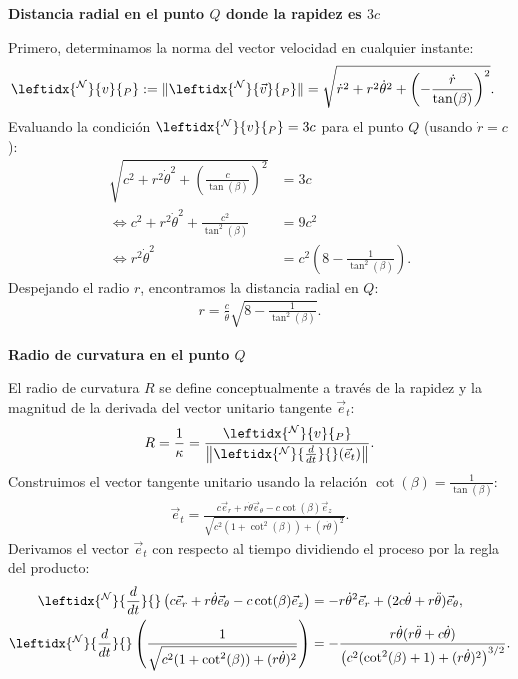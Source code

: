 \begin{tcolorbox}[title=Arbol de Navidad(pero sin condicion de R y $\theta$),breakable]
\vspace{0.8em}
\noindent\textbf{Distancia radial en el punto $Q$ donde la rapidez es $3c$}

Primero, determinamos la norma del vector velocidad en cualquier instante:
\begin{align*}
    \leftidx{^{\mathcal{N}}}{v}{_P} := \| \leftidx{^{\mathcal{N}}}{\vec{v}}{_P} \| &= \sqrt{ \dot{r}^2 + r^2\dot{\theta}^2 + \left( -\frac{\dot{r}}{\tan(\beta)} \right)^2 }.
\end{align*}
Evaluando la condición $\leftidx{^{\mathcal{N}}}{v}{_P} = 3c$ para el punto $Q$ (usando $\dot{r} = c$):
\begin{align*}
    \sqrt{ c^2 + r^2\dot{\theta}^2 + \left( \frac{c}{\tan(\beta)} \right)^2 } &= 3c \\
    \Leftrightarrow c^2 + r^2\dot{\theta}^2 + \frac{c^2}{\tan^2(\beta)} &= 9c^2 \\
    \Leftrightarrow r^2\dot{\theta}^2 &= c^2 \left( 8 - \frac{1}{\tan^2(\beta)} \right).
\end{align*}
Despejando el radio $r$, encontramos la distancia radial en $Q$:
\begin{align*}
    r = \frac{c}{\dot{\theta}} \sqrt{8 - \frac{1}{\tan^2(\beta)}}.
\end{align*}

\vspace{0.8em}
\noindent\textbf{Radio de curvatura en el punto $Q$}



El radio de curvatura $R$ se define conceptualmente a través de la rapidez y la magnitud de la derivada del vector unitario tangente $\vec{e}_t$:
\[
    R = \frac{1}{\kappa} = \frac{\leftidx{^{\mathcal{N}}}{v}{_P}}{\left\| \leftidx{^{\mathcal{N}}}{\frac{d}{dt}}{} (\vec{e}_t) \right\|}.
\]
Construimos el vector tangente unitario usando la relación $\cot(\beta) = \frac{1}{\tan(\beta)}$:
\begin{align*}
    \vec{e}_t = \frac{c\vec{e}_r + r\dot{\theta}\vec{e}_{\theta} - c\cot(\beta)\vec{e}_z}{\sqrt{c^2(1+\cot^2(\beta)) + (r\dot{\theta})^2}}.
\end{align*}
Derivamos el vector $\vec{e}_t$ con respecto al tiempo dividiendo el proceso por la regla del producto:
\begin{align*}
    \leftidx{^{\mathcal{N}}}{\frac{d}{dt}}{} \left( c\vec{e}_r + r\dot{\theta}\vec{e}_\theta - c\cot(\beta)\vec{e}_z \right) &= -r\dot{\theta}^2\vec{e}_r + (2c\dot{\theta} + r\ddot{\theta})\vec{e}_{\theta}, \\
    \leftidx{^{\mathcal{N}}}{\frac{d}{dt}}{} \left( \frac{1}{\sqrt{c^2(1+\cot^2(\beta)) + (r\dot{\theta})^2}} \right) &= -\frac{r\dot{\theta}(r\ddot{\theta} + c\dot{\theta})}{\left(c^2(\cot^2(\beta)+1) + (r\dot{\theta})^2\right)^{3/2}}.
\end{align*}


\end{tcolorbox}
